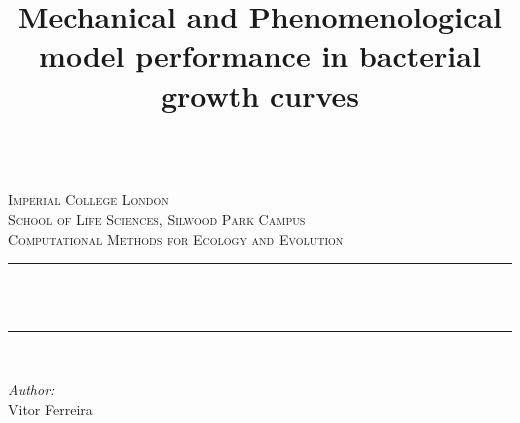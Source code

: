 \documentclass[11]{article}
\title{Mechanical and Phenomenological model performance in bacterial growth curves}
\begin{document}
    \begin{titlepage}

    \newcommand{\HRule}{\rule{\linewidth}{0.5mm}} %
    
    
  
    
    \center %
    
    \quad\\[1cm]
    \textsc{\Large Imperial College London}\\[1cm] %
    \textsc{\Large School of Life Sciences, Silwood Park Campus}\\[0.4cm] %
    \textsc{\large Computational Methods for Ecology and Evolution}\\[0.5cm] %
    
    \makeatletter
    \HRule \\[0.4cm]
    { \huge \bfseries \@title}\\[0.4cm] %
    \HRule \\[0.5cm]
     
    
    \begin{minipage}{0.4\textwidth}
    \begin{flushleft} \large
    \emph{Author:}\\
    Vitor Ferreira
    \end{flushleft}
    \end{minipage}
    ~
    \begin{minipage}{0.4\textwidth}
    \begin{flushright} \large
    \end{flushright}
    \end{minipage}\\[3cm]
    \makeatother
    

\end{titlepage}
\end{document}

